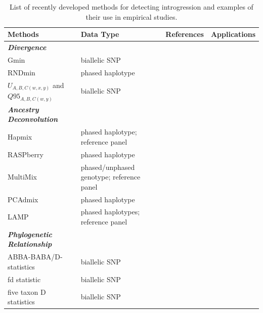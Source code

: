 \documentclass[11pt]{article}
\begin{document}
{

\nolinenumbers

\begin{table}[h]
\small
{}
\begin{center}
\caption{List of recently developed methods for detecting introgression and examples of their use in empirical studies.} \label{tab:tools}
\begin{tabular}{G{2.8cm}G{3.5cm}G{4cm}G{4cm}}
\\\toprule  
{}
{\bf Methods}	& {\bf Data Type } &	{\bf References} &  {\bf Applications } \\ \midrule

{\emph{\bf Divergence}} &   &   &   \\
Gmin &	biallelic SNP	&  \cite{geneva2015}	 &  \cite{kingan2015}\\
RNDmin	& phased haplotype	& \cite{rosenzweig2016} &  \cite{roda2017} \\
$U_{A,B,C(w,x,y)}$ and $Q95_{A,B,C(w,y)}$ & biallelic SNP & \cite{Racimo2015} & \cite{sams2016} \\

{\emph{\bf Ancestry Deconvolution}} &   &   &   \\
Hapmix	& phased haplotype; reference panel		& \cite{Price2009}	&  \cite{Hufford2013} \\ 
RASPberry &	phased haplotype &	\cite{wegmann2011}	 & \cite{christe2016} \\
MultiMix & phased/unphased genotype; reference panel &	\cite{churchhouse2013} &	\cite{eyheramendy2015} \\
PCAdmix	 & phased haplotype	 & \cite{brisbin2012pcadmix}	 &  \cite{moreno2014genetics} \\
LAMP  &	phased haplotypes; reference panel	 & \cite{sankararaman2008}	 & \cite{patterson2012} \\

{\emph{\bf Phylogenetic Relationship}} &   &   &   \\
ABBA-BABA/D-statistics	 & biallelic SNP  &	\cite{durand2011}	 &  \cite{heliconius2012} \\
fd statistic &	biallelic SNP &	\cite{martin2015}  &	\cite{zhang2016genome} \\ 
five taxon D statistics	& biallelic SNP	&  \cite{pease2015}	& \cite{fontaine2015} \\


\end{tabular}
\end{center}
\end{table}}
\end{document}

